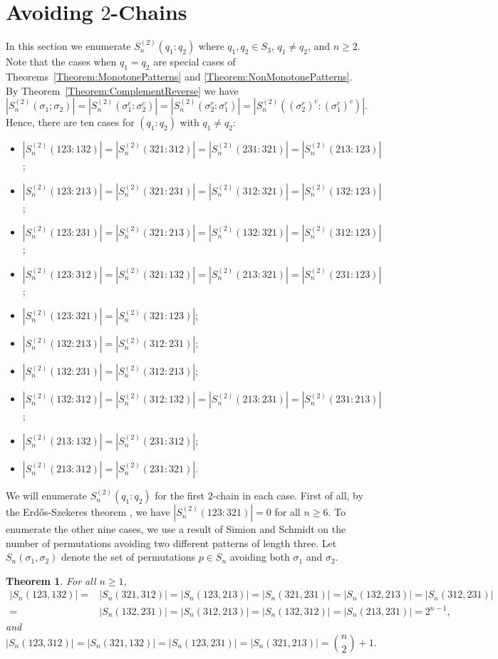 \documentclass[10pt,a4paper]{amsart}
\newtheorem{theorem}{Theorem}[section]
\numberwithin{equation}{section}
\begin{document}
\section{Avoiding $2$-Chains}\label{Section:2Chain}
In this section we enumerate $S_n^{(2)}(q_1:q_2)$ where $q_1,q_2\in S_3$, $q_1\neq q_2$, and $n\geq2$. Note that the cases when $q_1=q_2$ 
are special cases of Theorems~\ref{Theorem:MonotonePatterns} and \ref{Theorem:NonMonotonePatterns}. By Theorem~\ref{Theorem:ComplementReverse} we have \[|S_n^{(2)}(\sigma_1;\sigma_2)|=|S_n^{(2)}(\sigma_1^c:\sigma_2^c)|=|S_n^{(2)}(\sigma_2^r:\sigma_1^r)|=|S_n^{(2)}((\sigma_2^r)^c:(\sigma_1^r)^c)|.\] 
Hence, there are ten cases for $(q_1:q_2)$ with $q_1\neq q_2$:
\begin{itemize}
    \item $|S_n^{(2)}(123:132)|=|S_n^{(2)}(321:312)|=|S_n^{(2)}(231:321)|=|S_n^{(2)}(213:123)|$;
    \item $|S_n^{(2)}(123:213)|=|S_n^{(2)}(321:231)|=|S_n^{(2)}(312:321)|=|S_n^{(2)}(132:123)|$;
    \item $|S_n^{(2)}(123:231)|=|S_n^{(2)}(321:213)|=|S_n^{(2)}(132:321)|=|S_n^{(2)}(312:123)|$;
    \item $|S_n^{(2)}(123:312)|=|S_n^{(2)}(321:132)|=|S_n^{(2)}(213:321)|=|S_n^{(2)}(231:123)|$;
    \item $|S_n^{(2)}(123:321)|=|S_n^{(2)}(321:123)|$;
    \item $|S_n^{(2)}(132:213)|=|S_n^{(2)}(312:231)|$;
    \item $|S_n^{(2)}(132:231)|=|S_n^{(2)}(312:213)|$;
    \item $|S_n^{(2)}(132:312)|=|S_n^{(2)}(312:132)|=|S_n^{(2)}(213:231)|=|S_n^{(2)}(231:213)|$;
    \item $|S_n^{(2)}(213:132)|=|S_n^{(2)}(231:312)|$;
    \item $|S_n^{(2)}(213:312)|=|S_n^{(2)}(231:321)|$.
\end{itemize}

We will enumerate $S_n^{(2)}(q_1:q_2)$ for the first $2$-chain in each case. First of all, by the Erd\H{o}s-Szekeres theorem \cite[p. 467]{ErdosSzekeres1935}, we have $|S_n^{(2)}(123:321)|=0$ for all $n\geq6$. To enumerate the other nine cases, 
we use a result of Simion and Schmidt \cite{SimionSchmidt1985} on the number of permutations avoiding two different patterns of length three. 
Let
$S_n(\sigma_1,\sigma_2)$ denote the set of permutations $p\in S_n$ avoiding both $\sigma_1$ and $\sigma_2$.
\begin{theorem}{\rm\cite[Section 3]{SimionSchmidt1985}}\label{Theorem:Pairs3}
For all $n\geq1$,
    \[
   \begin{split}
|S_n(123,132)|=&|S_n(321,312)|=|S_n(123,213)|=|S_n(321,231)|=|S_n(132,213)|=|S_n(312,231)|\\=&|S_n(132,231)|=|S_n(312,213)|=|S_n(132,312)|=|S_n(213,231)|=2^{n-1},
   \end{split} 
    \]
    and
    \[
    |S_n(123,312)|=|S_n(321,132)|=|S_n(123,231)|=|S_n(321,213)|=\binom{n}{2}+1.
    \]
\end{theorem}
\end{document}

